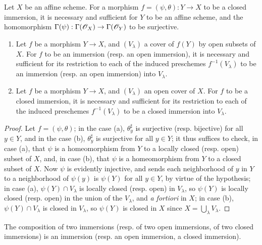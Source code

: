 \begin{cor}[4.2.3]
\label{1.4.2.3}
Let $X$ be an affine scheme.
For a morphism $f=(\psi,\theta):Y\to X$ to be a closed immersion, it is necessary and sufficient for $Y$ to be an affine scheme, and the homomorphism $\Gamma(\psi):\Gamma(\OO_X)\to\Gamma(\OO_Y)$ to be surjective.
\end{cor}

\begin{cor}[4.2.4]
\label{1.4.2.4}
\medskip\noindent
\begin{enumerate}[label={\rm(\alph*)}]
  \item Let $f$ be a morphism $Y\to X$, and $(V_\lambda)$ a cover of $f(Y)$ by open subsets of $X$.
    For $f$ to be an immersion (resp. an open immersion), it is necessary and sufficient
    for its restriction to each of the induced preschemes $f^{-1}(V_\lambda)$ to be an immersion (resp. an open immersion) into $V_\lambda$.
  \item Let $f$ be a morphism $Y\to X$, and $(V_\lambda)$ an open cover of $X$.
    For $f$ to be a closed immersion, it is necessary and sufficient for its restriction to each of the induced preschemes $f^{-1}(V_\lambda)$ to be a closed immersion into $V_\lambda$.
\end{enumerate}
\end{cor}

\begin{proof}
\label{proof-1.4.2.4}
Let $f=(\psi,\theta)$;
in the case (a), $\theta_y^\sharp$ is surjective (resp. bijective) for all $y\in Y$, and in the case (b), $\theta_y^\sharp$ is surjective for all $y\in Y$;
it thus suffices to check, in case (a), that $\psi$ is a homeomorphism from $Y$ to a locally closed (resp. open) subset of $X$, and, in case (b), that $\psi$ is a homeomorphism from $Y$ to a closed subset of $X$.
Now $\psi$ is evidently injective, and sends each neighborhood of $y$ in $Y$ to a neighborhood of $\psi(y)$ is $\psi(Y)$ for all $y\in Y$, by virtue of the hypothesis;
in case (a), $\psi(Y)\cap V_\lambda$ is locally closed (resp. open) in $V_\lambda$, so $\psi(Y)$ is locally closed (resp. open) in the union of the $V_\lambda$, and \emph{a fortiori} in $X$;
in case (b), $\psi(Y)\cap V_\lambda$ is closed in $V_\lambda$, so $\psi(Y)$ is closed in $X$ since $X=\bigcup_\lambda V_\lambda$.
\end{proof}

\begin{prop}[4.2.5]
\label{1.4.2.5}
The composition of two immersions (resp. of two open immersions, of two closed immersions) is an immersion (resp. an open immersion, a closed immersion).
\end{prop}

